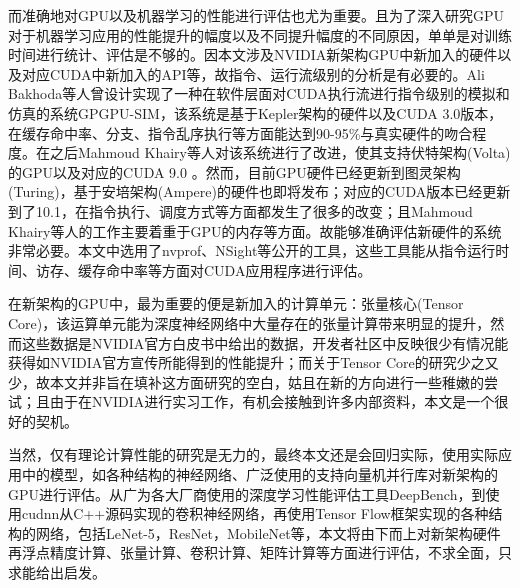 \par 而准确地对GPU以及机器学习的性能进行评估也尤为重要。且为了深入研究GPU对于机器学习应用的性能提升的幅度以及不同提升幅度的不同原因，单单是对训练时间进行统计、评估是不够的。因本文涉及NVIDIA新架构GPU中新加入的硬件以及对应CUDA中新加入的API等，故指令、运行流级别的分析是有必要的。Ali Bakhoda等人曾设计实现了一种在软件层面对CUDA执行流进行指令级别的模拟和仿真的系统GPGPU-SIM，该系统是基于Kepler架构的硬件以及CUDA 3.0版本，在缓存命中率、分支、指令乱序执行等方面能达到90-95\%与真实硬件的吻合程度\cite{GPGPUSIM}。在之后Mahmoud Khairy等人对该系统进行了改进，使其支持伏特架构(Volta)的GPU以及对应的CUDA 9.0 \cite{GPGPUSIM2}。然而，目前GPU硬件已经更新到图灵架构(Turing)，基于安培架构(Ampere)的硬件也即将发布；对应的CUDA版本已经更新到了10.1，在指令执行、调度方式等方面都发生了很多的改变；且Mahmoud Khairy等人的工作主要着重于GPU的内存等方面。故能够准确评估新硬件的系统非常必要。本文中选用了nvprof、NSight等公开的工具，这些工具能从指令运行时间、访存、缓存命中率等方面对CUDA应用程序进行评估\cite{NSIGHT}。
\par 在新架构的GPU中，最为重要的便是新加入的计算单元：张量核心(Tensor Core)，该运算单元能为深度神经网络中大量存在的张量计算带来明显的提升\cite{VOLTAWHITEPAPER}，然而这些数据是NVIDIA官方白皮书中给出的数据，开发者社区中反映很少有情况能获得如NVIDIA官方宣传所能得到的性能提升；而关于Tensor Core的研究少之又少，故本文并非旨在填补这方面研究的空白，姑且在新的方向进行一些稚嫩的尝试；且由于在NVIDIA进行实习工作，有机会接触到许多内部资料，本文是一个很好的契机。
\par 当然，仅有理论计算性能的研究是无力的，最终本文还是会回归实际，使用实际应用中的模型，如各种结构的神经网络、广泛使用的支持向量机并行库对新架构的GPU进行评估。从广为各大厂商使用的深度学习性能评估工具DeepBench\cite{DEEPBENCH}，到使用cudnn从C++源码实现的卷积神经网络，再使用Tensor Flow框架实现的各种结构的网络，包括LeNet-5\cite{LENET}，ResNet\cite{RESNET}，MobileNet\cite{MOBILE}等，本文将由下而上对新架构硬件再浮点精度计算、张量计算、卷积计算、矩阵计算等方面进行评估，不求全面，只求能给出启发。

